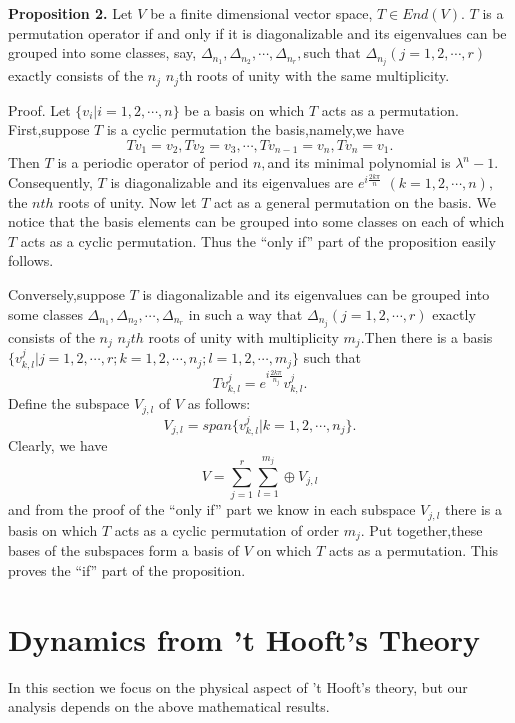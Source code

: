 \documentclass[a4paper,12pt]{article}
\begin{document}
\textbf{Proposition 2.} Let $V$ be a finite dimensional vector space, $T\in
End(V).$ $T$ is a permutation operator if and only if it is diagonalizable
and its eigenvalues can be grouped into some classes, say, $\Delta
_{n_1},\Delta _{n_2},\cdots ,\Delta _{n_r},$such that $\Delta
_{n_j}(j=1,2,\cdots ,r)$ exactly consists of the $n_j$ $n_j$th roots of
unity with the same multiplicity.

Proof. Let $\{v_i|i=1,2,\cdots ,n\}$ be a basis on which $T$ acts as a
permutation. First,suppose $T$ is a cyclic permutation the basis,namely,we
have
\begin{equation}
Tv_1=v_2,Tv_2=v_3,\cdots ,Tv_{n-1}=v_n,Tv_n=v_1.
\end{equation}
Then $T$ is a periodic operator of period $n,$and its minimal polynomial is $%
\lambda ^n-1.$Consequently, $T$ is diagonalizable and its eigenvalues are $%
e^{i\frac{2k\pi }n}$ $(k=1,2,\cdots ,n),$the $nth$ roots of unity. Now let $%
T $ act as a general permutation on the basis. We notice that the basis
elements can be grouped into some classes on each of which $T$ acts as a
cyclic permutation. Thus the ``only if'' part of the proposition easily
follows.

Conversely,suppose $T$ is diagonalizable and its eigenvalues can be grouped
into some classes $\Delta _{n_1},\Delta _{n_2},\cdots ,\Delta _{n_r}$ in
such a way that $\Delta _{n_j}(j=1,2,\cdots ,r)$ exactly consists of the $%
n_j $ $n_jth$ roots of unity with multiplicity $m_j.$Then there is a basis $%
\{v_{k,l}^j|j=1,2,\cdots ,r;k=1,2,\cdots ,n_j;l=1,2,\cdots ,m_j\}$ such that
\begin{equation}
Tv_{k,l}^j=e^{i\frac{2k\pi }{n_j}}v_{k,l}^j.
\end{equation}
Define the subspace $V_{j,l}$ of $V$ as follows:
\[
V_{j,l}=span\{v_{k,l}^j|k=1,2,\cdots ,n_j\}.
\]
Clearly, we have
\[
V=\sum_{j=1}^r\sum_{l=1}^{m_j}\oplus V_{j,l}
\]
and from the proof of the ``only if'' part we know in each subspace $V_{j,l}$
there is a basis on which $T$ acts as a cyclic permutation of order $m_j$.
Put together,these bases of the subspaces form a basis of $V$ on which $T$
acts as a permutation. This proves the ``if'' part of the proposition.

\section{Dynamics from 't Hooft's Theory}

In this section we focus on the physical aspect of 't Hooft's theory, but
our analysis depends on the above mathematical results.
\end{document}
